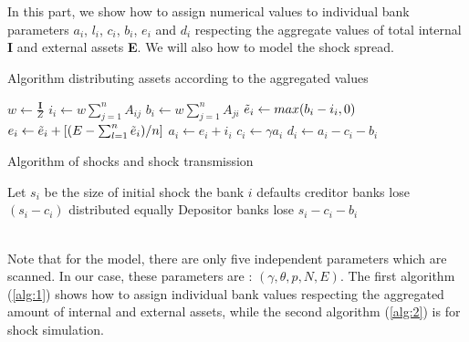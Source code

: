 \documentclass[14pt]{article}
\providecommand{\reff}[1]{(\ref{#1})}
\begin{document}
\\
\\In this part, we show how to assign numerical values to individual bank parameters $a_i$, $l_i$, $c_i$, $b_i$, $e_i$ and $d_i$ respecting the aggregate values of total internal \textbf{I} and external assets \textbf{E}. We will also how to model the shock spread.

\begin{minipage}[t]{5cm}
  \vspace{0pt}  
  \begin{algorithm}[H]
    \caption{Algorithm distributing assets according to the aggregated values  }
    \label{alg:1}
    \begin{algorithmic}
\STATE $w \gets \frac{\boldsymbol{I}}{Z}$
\STATE $i_i \gets w \sum_{j=1}^n A_{ij}$
\STATE $b_i \gets w \sum_{j=1}^n A_{ji}$
\STATE $\Tilde{e}_i \gets max(b_i-i_i , 0)$
\ENDFOR
{}
\STATE $e_i \gets \Tilde{e}_i + [(E- \sum_{l=1}^n \Tilde{e}_i)/n]$ 
\STATE $a_i \gets e_i + i_i$ 
\STATE $c_i \gets \gamma a_i $ 
\STATE $d_i \gets a_i - c_i -b_i$ 
\ENDFOR
\end{algorithmic}
\end{algorithm}
\end{minipage}%
\begin{minipage}[t]{5cm}
  \vspace{0pt}
  \begin{algorithm}[H]
    \caption{Algorithm of shocks and shock transmission }
    \label{alg:2}
    \begin{algorithmic}
\STATE Let $s_i$ be the size of initial shock
\STATE the bank $i$ defaults
\ENDIF
{} 
\STATE creditor banks lose $(s_i-c_i)$ distributed equally
\ELSE
\STATE Depositor banks lose $s_i-c_i-b_i$
\ENDIF

\end{algorithmic}
  \end{algorithm}
\end{minipage}%
\\Note that for the model, there are only five independent parameters which are scanned. In our case, these parameters are : $(\gamma , \theta, p , N,E)$. The first algorithm \reff{alg:1} shows how to assign individual bank values respecting the aggregated amount of internal and external assets, while the second algorithm \reff{alg:2} is for shock simulation.
\end{document}
